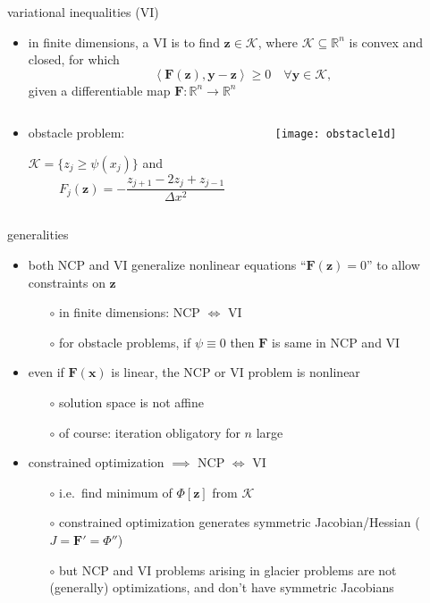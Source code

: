 \documentclass{beamer}
\newcommand\bx{\mathbf{x}}
\newcommand\by{\mathbf{y}}
\newcommand\bz{\mathbf{z}}
\newcommand\bF{\mathbf{F}}
\newcommand\RR{\mathbb{R}}
\newcommand{\ip}[2]{\ensuremath{\left<#1,#2\right>}}
\begin{document}
\begin{frame}{variational inequalities (VI)}

\begin{itemize}
\item in finite dimensions, a VI is to find $\bz\in\mathcal{K}$, where $\mathcal{K}\subseteq \RR^n$ is convex and closed, for which
\begin{equation}
     \ip{\bF(\bz)}{\by-\bz} \ge 0 \quad \forall \by \in \mathcal{K},
\end{equation}
given a differentiable map $\bF:\RR^n \to \RR^n$
\end{itemize}

\begin{columns}
\begin{column}{0.5\textwidth}
\small
\begin{itemize}
\item obstacle problem:

$\mathcal{K} = \{z_j \ge \psi(x_j)\}$ and
  $$F_j(\bz) = - \frac{z_{j+1} - 2 z_j + z_{j-1}}{\Delta x^2}$$
\end{itemize}
\end{column}
\begin{column}{0.5\textwidth}
\texttt{[image: obstacle1d]}
\end{column}
\end{columns}\end{frame}


\begin{frame}{generalities}

\begin{itemize}
\item both NCP and VI generalize nonlinear equations ``$\bF(\bz)=0$'' to allow constraints on $\bz$
  \begin{itemize}
  \item[$\circ$]  in finite dimensions: NCP $\iff$ VI
  \item[$\circ$]  for obstacle problems, if $\psi\equiv 0$ then $\bF$ is same in NCP and VI
  \end{itemize}
\item even if $\bF(\bx)$ is linear, the NCP or VI problem is nonlinear
  \begin{itemize}
  \item[$\circ$]  solution space is not affine
  \item[$\circ$]  of course: iteration obligatory for $n$ large
  \end{itemize}
\item constrained optimization $\implies$ NCP $\iff$ VI
  \begin{itemize}
  \item[$\circ$]  i.e.~find minimum of $\Phi[\bz]$ from $\mathcal{K}$
  \item[$\circ$]  constrained optimization generates symmetric Jacobian/Hessian ($J = \bF' = \Phi''$)
  \item[$\circ$]  \alert{but} NCP and VI problems arising in glacier problems are not (generally) optimizations, and don't have symmetric Jacobians
  \end{itemize}
\end{itemize}
\end{frame}
\end{document}
